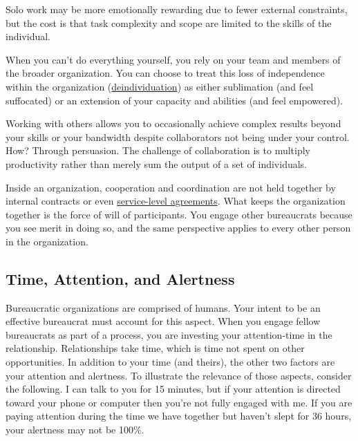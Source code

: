 Solo work may be more emotionally rewarding due to fewer external constraints, but the cost is that task complexity and scope are limited to the skills of the individual. 


When you can't do everything yourself, you rely on your team and members of the broader organization. You can choose to treat this loss of independence within the organization (\href{https://en.wikipedia.org/wiki/Deindividuation}{deindividuation}) 
\iftoggle{WPinmargin}{\marginpar{$>$Wikipedia: deindividuation}}{ }
as either sublimation (and feel suffocated) or an extension of your capacity and abilities (and feel empowered).

Working with others allows you to occasionally achieve complex results beyond your skills or your bandwidth despite  collaborators not being under your control. How? Through persuasion. 
The challenge of collaboration is to multiply productivity rather than merely sum the output of a set of individuals. 

Inside an organization, cooperation and coordination are not held together by internal contracts or even \href{https://en.wikipedia.org/wiki/Service-level_agreement}{service-level agreements}. 
%
\iftoggle{WPinmargin}{\marginpar{$>$Wikipedia: Service-level agreements}}{ }
What keeps the organization together is the force of will of participants. 
You engage other bureaucrats because you see merit in doing so, and the same perspective applies to every other person in the organization.

\subsection*{Time, Attention, and Alertness}

Bureaucratic organizations are comprised of humans. Your intent to be an effective bureaucrat must account for this aspect.
When you engage fellow bureaucrats as part of a process, you are investing your \gls{attention-time} in the relationship. Relationships take time, which is time not spent on other opportunities. In addition to your time (and theirs), the other two factors are your attention and alertness. To illustrate the relevance of those aspects, consider the following. I can talk to you for 15 minutes, but if your attention is directed toward your phone or computer then you're not fully engaged with me. If you are paying attention during the time we have together but haven't slept for 36 hours, your alertness may not be 100\%. 

